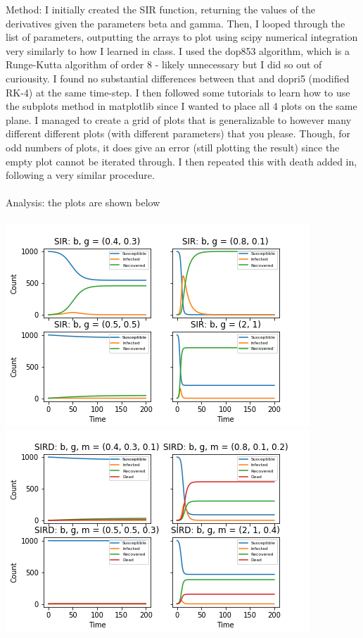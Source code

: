 \documentclass[11pt]{article}
\begin{document}
Method: I initially created the SIR function, returning the values of the derivatives given the parameters beta and gamma. Then, I looped through the list of parameters, outputting the arrays to plot using scipy numerical integration very similarly to how I learned in class. I used the dop853 algorithm, which is a Runge-Kutta algorithm of order 8 - likely unnecessary but I did so out of curiousity. I found no substantial differences between that and dopri5 (modified RK-4) at the same time-step. I then followed some tutorials to learn how to use the subplots method in matplotlib since I wanted to place all 4 plots on the same plane. I managed to create a grid of plots that is generalizable to however many different different plots (with different parameters) that you please. Though, for odd numbers of plots, it does give an error (still plotting the result) since the empty plot cannot be iterated through. I then repeated this with death added in, following a very similar procedure.\\
\\
Analysis: the plots are shown below\\
\\
\includegraphics[scale = 0.7]{SIR.png}\\
\includegraphics[scale = 0.7]{SIRD.png}\\
\end{document}
